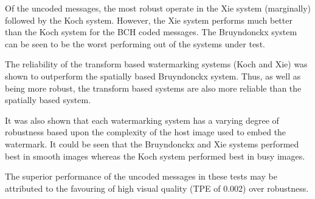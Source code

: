 \documentclass[12pt]{report}
\begin{document}
Of the uncoded messages, the most robust operate in the Xie system (marginally) followed by the Koch system.
However, the Xie system performs much better than the Koch system for the BCH coded messages.
The Bruyndonckx system can be seen to be the worst performing out of the systems under test.

The reliability of the transform based watermarking systems (Koch and Xie) was shown to outperform the spatially based
Bruyndonckx system. Thus, as well as being more robust, the transform based systems are also more reliable than 
the spatially based system.

It was also shown that each watermarking system has a varying degree of robustness based upon the complexity of the 
host image used to embed the watermark. It could be seen that the Bruyndonckx and Xie systems performed 
best in smooth images whereas the Koch system performed best in busy images.

The superior performance of the uncoded messages in these tests may be attributed
to the favouring of high visual quality (TPE of 0.002) over robustness. 
\end{document}

